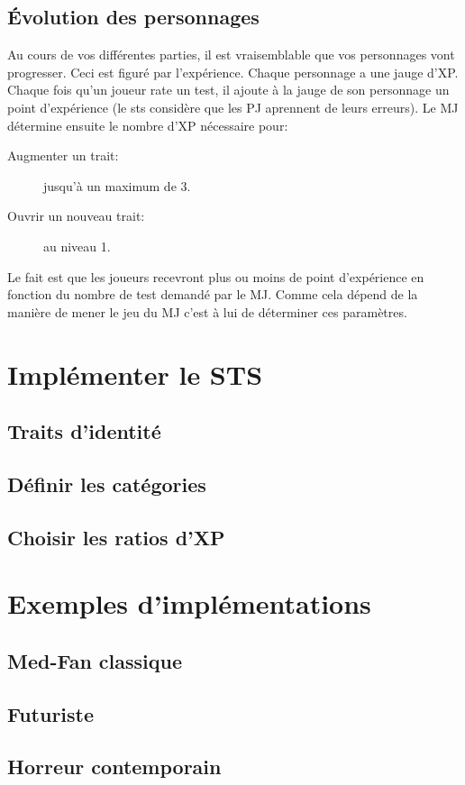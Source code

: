 \documentclass[a4paper,10pt,twoside,twocolumn]{article}
\begin{document}
 
 \subsection{Évolution des personnages}
 \label{rule::evolv}
 
 Au cours de vos différentes parties, il est vraisemblable que vos personnages vont progresser. Ceci est figuré par l'expérience. Chaque personnage a une jauge d'XP. Chaque fois qu'un joueur rate un test, il ajoute à la jauge de son personnage un point d'expérience (le sts considère que les PJ aprennent de leurs erreurs). Le MJ détermine ensuite le nombre d'XP nécessaire pour:
 
 \begin{description}
  \item[Augmenter un trait:] jusqu'à un maximum de 3.
  \item[Ouvrir un nouveau trait:] au niveau 1.
 \end{description}

 Le fait est que les joueurs recevront plus ou moins de point d'expérience en fonction du nombre de test demandé par le MJ. Comme cela dépend de la manière de mener le jeu du MJ c'est à lui de déterminer ces paramètres.
 
 \section{Implémenter le STS}
 \label{implem}
 
 \subsection{Traits d'identité}
 \label{implem::traits}
 
 \subsection{Définir les catégories}
 \label{implem::cat}
 
 \subsection{Choisir les ratios d'XP}
 \label{implem::cat}
 
 \section{Exemples d'implémentations}
 \label{exempl}
 
 \subsection{Med-Fan classique}
 
 \subsection{Futuriste}
 
 \subsection{Horreur contemporain}
 
\end{document}
